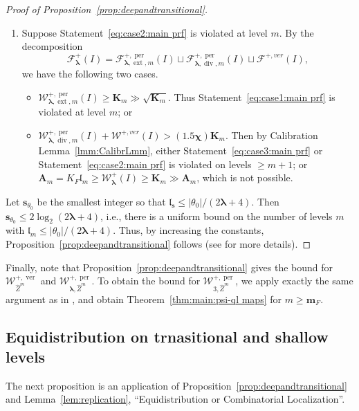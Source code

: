 \documentclass{amsart}
\newcommand{\1}{{\mathbb 1 }}
\newcommand{\blambda}{{\boldsymbol\lambda}}
\newcommand{\ext}{{\operatorname{ext}}}
\renewcommand{\div}{{\operatorname{div}}}
\newcommand{\Fam}{{\mathcal F}}
\newcommand{\Width}{{\mathcal W}}
\newcommand{\bA}{{\mathbf{A}}}
\newcommand{\wZ}{{\widehat Z}}
\newcommand{\bK}{{\mathbf K}}
\newcommand{\bbm}{{\mathbf m}}
\newcommand{\bbs}{{\mathbf s}}
\newcommand{\length}{{\mathfrak l}}
\newcommand\ver{{\operatorname{ver}}}
\newcommand\per{{\operatorname{per}}}
\theoremstyle{remark}
\numberwithin{equation}{section}
\theoremstyle{definition}
\newcommand{\bchi}{{\boldsymbol{ \chi}}}
\begin{document}
\begin{proof}[Proof of Proposition~\ref{prop:deepandtransitional}]
\begin{enumerate}[label=\text{(\roman*)},font=\normalfont,leftmargin=*]
\item Suppose Statement~\ref{eq:case2:main prf} is violated at level $m$. By the decomposition 
$$
\Fam_\blambda^+(I)={\Fam^{+, \per}_{\blambda,\ext,m}(I)\sqcup \Fam^{+, \per}_{\blambda,\div,m}(I)\sqcup \Fam^{+, ver}(I)},
$$ 
we have the following two cases.
\begin{itemize}
    \item $\Width^{+, \per}_{\blambda,\ext,m}(I) \geq \bK_m \gg \sqrt{\bK_m}$. Thus Statement~\ref{eq:case1:main prf} is violated at level $m$; or
    \item $\Width^{+, \per}_{\blambda,\div,m}(I) + \Width^{+, ver}(I) > (1.5\bchi)\bK_m$. Then by Calibration Lemma~\ref{lmm:CalibrLmm}, either Statement~\ref{eq:case3:main prf} or Statement~\ref{eq:case2:main prf}  is violated on levels $\ge m+1$; or $\bA_m = K_F \length_m \geq \Width^+_\blambda(I) \geq \bK_m \gg \bA_m$, which is not possible.
\end{itemize} 
\end{enumerate}

Let $\bbs_{\theta_0}$ be the smallest integer so that $\length_\bbs \leq |\theta_0|/(2\blambda + 4)$. Then $\bbs_{\theta_0} \le 2 \log_2(2\blambda+4)$, i.e., there is a uniform bound on the number of levels $m$ with $\length_m \leq |\theta_0|/(2\blambda + 4)$. Thus, by increasing the constants, Proposition~\ref{prop:deepandtransitional} follows (see \cite[Lemma 10.4]{DL22} for more details).
\end{proof}

Finally, note that Proposition~\ref{prop:deepandtransitional} gives the bound for $\Width^{+, \ver}_{\wZ^m}$ and $\Width_{\blambda,\wZ^m}^{+,\per}$. To obtain the bound for $\Width_{3,\wZ^m}^{+,\per}$, we apply exactly the same argument as in \cite[\S 10.1.1]{DL22}, and obtain Theorem~\ref{thm:main:psi-ql maps} for $m \geq \bbm_F$.

\subsection{Equidistribution on trnasitional and shallow levels}\label{subsec:shallow}

The next proposition is an application of Proposition~\ref{prop:deepandtransitional} and Lemma~\ref{lem:replication}, ``Equidistribution or Combinatorial Localization''.
\end{document}
